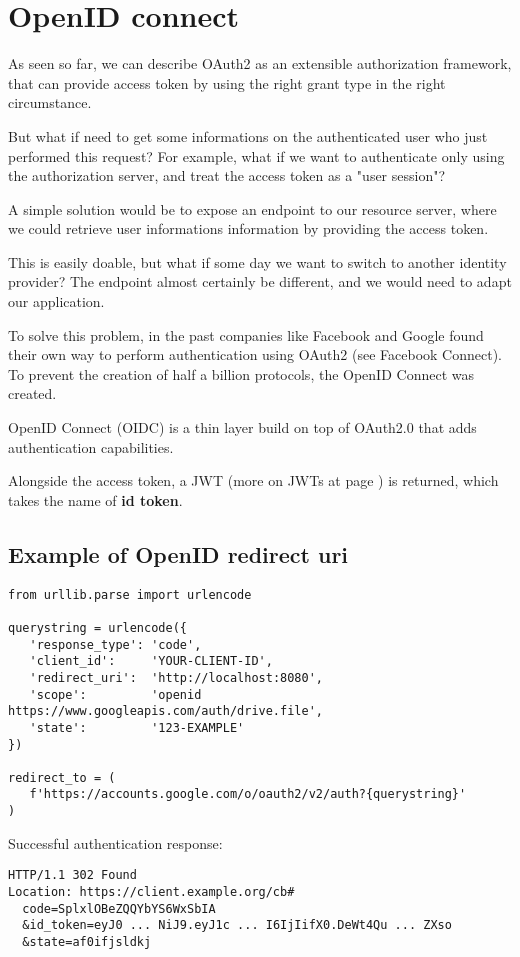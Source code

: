 \section{OpenID connect}
\label{openid}
As seen so far, we can describe OAuth2 as an extensible authorization
framework, that can provide access token by using the right grant type in the
right circumstance.

But what if need to get some informations on the authenticated user who just
performed this request?
For example, what if we want to authenticate only using the authorization
server, and treat the access token as a "user session"?

A simple solution would be to expose an endpoint to our resource server, where
we could retrieve user informations information by providing the access token.

This is easily doable, but what if some day we want to switch to another identity provider?
The endpoint almost certainly be different, and we would need to adapt our
application.


To solve this problem, in the past companies like
Facebook  and Google found their own way to perform authentication using OAuth2
(see Facebook Connect).
To prevent the creation of half a billion protocols, the OpenID Connect
was created.

OpenID Connect (OIDC) is a thin layer build on top of OAuth2.0 that adds
authentication capabilities.


Alongside the access token, a JWT (more on JWTs at page \pageref{jwt}) is
returned, which takes the name of \textbf{id token}.

\subsection{Example of OpenID redirect uri}

\begin{lstlisting}
from urllib.parse import urlencode

querystring = urlencode({
   'response_type': 'code',
   'client_id':     'YOUR-CLIENT-ID',
   'redirect_uri':  'http://localhost:8080',
   'scope':         'openid https://www.googleapis.com/auth/drive.file',
   'state':         '123-EXAMPLE'
})

redirect_to = (
   f'https://accounts.google.com/o/oauth2/v2/auth?{querystring}'
)
\end{lstlisting}

Successful authentication response:
\begin{lstlisting}
HTTP/1.1 302 Found
Location: https://client.example.org/cb#
  code=SplxlOBeZQQYbYS6WxSbIA
  &id_token=eyJ0 ... NiJ9.eyJ1c ... I6IjIifX0.DeWt4Qu ... ZXso
  &state=af0ifjsldkj
\end{lstlisting}

